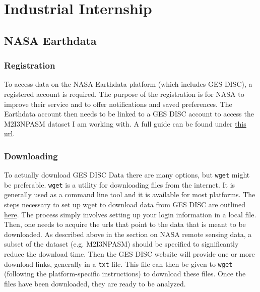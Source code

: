 \documentclass[../00_main.tex]{subfiles}
\begin{document}
\section{Industrial Internship}

\subsection{NASA Earthdata}

\subsubsection{Registration}

To access data on the NASA Earthdata platform (which includes GES DISC),
a registered account is required. The purpose of the registration is for NASA
to improve their service and to offer notifications and saved preferences.
The Earthdata account then needs to be linked to a GES DISC account to access
the M2I3NPASM dataset I am working with. A full guide can be found under 
\href{https://www.unidata.ucar.edu/software/netcdf/}{this url}.

\subsubsection{Downloading}

To actually download GES DISC Data there are many options, but \texttt{wget}
might be preferable. \texttt{wget} is a utility for downloading files from the
internet. It is generally used as a command line tool and it is available for
most platforms. The steps necessary to set up wget to download data from GES
DISC are outlined 
\href{https://disc.gsfc.nasa.gov/data-access#mac_linux_wget}{here}. The process
simply involves setting up your login information in a local file. Then, one
needs to acquire the urls that point to the data that is meant to be
downloaded. As described above in the section on NASA remote sensing data,
a subset of the dataset (e.g. M2I3NPASM) should be specified to significantly
reduce the download time. Then the GES DISC website will provide one or more
download links, generally in a \texttt{txt} file. This file can then be given
to \texttt{wget} (following the platform-specific instructions) to download
these files. Once the files have been downloaded, they are ready to be
analyzed. 
\end{document}
